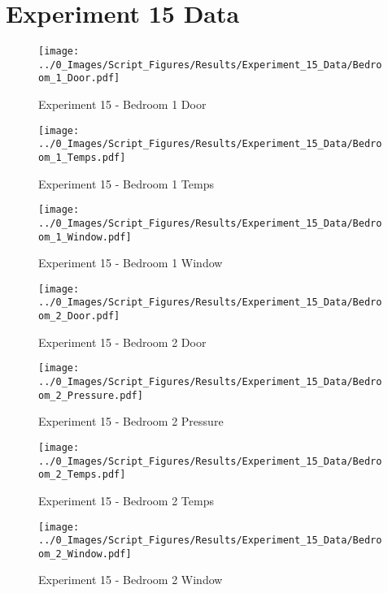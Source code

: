 	\clearpage

\clearpage		\large
\section{Experiment 15 Data} \label{App:Exp15Results} 

	\begin{figure}[H]
		\centering
		\texttt{[image: ../0\_Images/Script\_Figures/Results/Experiment\_15\_Data/Bedroom\_1\_Door.pdf]}
		\caption[]{Experiment 15 - Bedroom 1 Door}
	\end{figure}
 

	\begin{figure}[H]
		\centering
		\texttt{[image: ../0\_Images/Script\_Figures/Results/Experiment\_15\_Data/Bedroom\_1\_Temps.pdf]}
		\caption[]{Experiment 15 - Bedroom 1 Temps}
	\end{figure}
 
	\clearpage

	\begin{figure}[H]
		\centering
		\texttt{[image: ../0\_Images/Script\_Figures/Results/Experiment\_15\_Data/Bedroom\_1\_Window.pdf]}
		\caption[]{Experiment 15 - Bedroom 1 Window}
	\end{figure}
 

	\begin{figure}[H]
		\centering
		\texttt{[image: ../0\_Images/Script\_Figures/Results/Experiment\_15\_Data/Bedroom\_2\_Door.pdf]}
		\caption[]{Experiment 15 - Bedroom 2 Door}
	\end{figure}
 
	\clearpage

	\begin{figure}[H]
		\centering
		\texttt{[image: ../0\_Images/Script\_Figures/Results/Experiment\_15\_Data/Bedroom\_2\_Pressure.pdf]}
		\caption[]{Experiment 15 - Bedroom 2 Pressure}
	\end{figure}
 

	\begin{figure}[H]
		\centering
		\texttt{[image: ../0\_Images/Script\_Figures/Results/Experiment\_15\_Data/Bedroom\_2\_Temps.pdf]}
		\caption[]{Experiment 15 - Bedroom 2 Temps}
	\end{figure}
 
	\clearpage

	\begin{figure}[H]
		\centering
		\texttt{[image: ../0\_Images/Script\_Figures/Results/Experiment\_15\_Data/Bedroom\_2\_Window.pdf]}
		\caption[]{Experiment 15 - Bedroom 2 Window}
	\end{figure}
 

